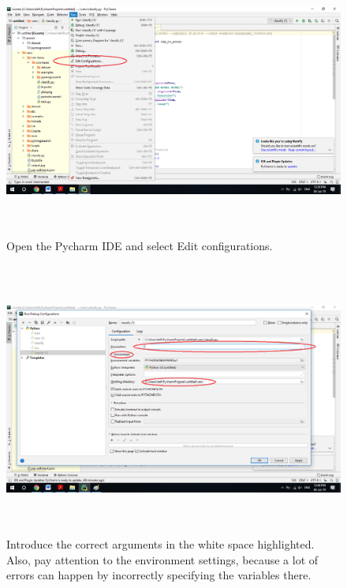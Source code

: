 \documentclass[12pt,a4paper,twoside]{report}
\begin{document}
\begin{figure}[h!]
	\centering
	\includegraphics[width=15cm, height=9cm]{img/data/imagerun2.png}
	\caption[]
	{Open the Pycharm IDE and select Edit configurations.}
	\label{fig:imagerun2}
\end{figure}

\begin{figure}[h!]
	\centering
	\includegraphics[width=15cm, height=9cm]{img/data/imagerun3.png}
	\caption[]
	{Introduce the correct arguments in the white space highlighted. Also, pay attention to the environment settings, because a lot of errors can happen by incorrectly specifying the variables there.}
	\label{fig:imagerun3}
\end{figure}
\end{document}
